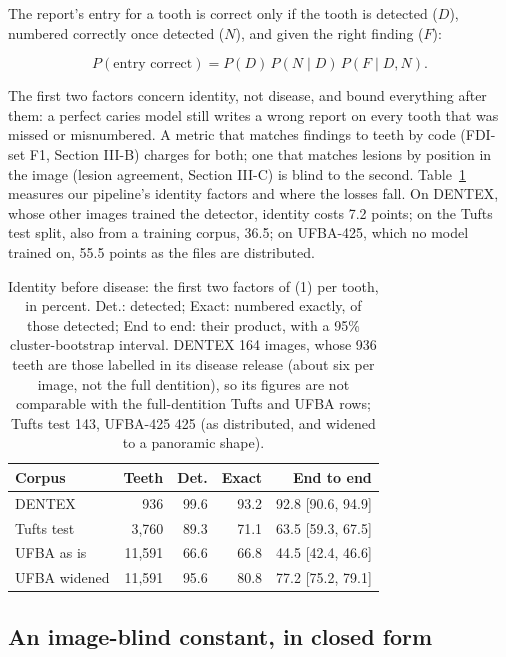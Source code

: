\documentclass[conference]{IEEEtran}
\begin{document}
The report's entry for a tooth is correct only if the tooth is detected ($D$), numbered correctly once detected ($N$), and given the right finding ($F$):

\begin{equation}
P(\text{entry correct}) = P(D)\, P(N \mid D)\, P(F \mid D, N).
\end{equation}

The first two factors concern identity, not disease, and bound everything after them: a perfect caries model still writes a wrong report on every tooth that was missed or misnumbered. A metric that matches findings to teeth by code (FDI-set F1, Section III-B) charges for both; one that matches lesions by position in the image (lesion agreement, Section III-C) is blind to the second. Table~\ref{tab:1} measures our pipeline's identity factors and where the losses fall. On DENTEX, whose other images trained the detector, identity costs 7.2 points; on the Tufts test split, also from a training corpus, 36.5; on UFBA-425, which no model trained on, 55.5 points as the files are distributed.

\begin{table}[t]
\centering
\caption{Identity before disease: the first two factors of (1) per tooth, in percent. Det.: detected; Exact: numbered exactly, of those detected; End to end: their product, with a 95\% cluster-bootstrap interval. DENTEX 164 images, whose 936 teeth are those labelled in its disease release (about six per image, not the full dentition), so its figures are not comparable with the full-dentition Tufts and UFBA rows; Tufts test 143, UFBA-425 425 (as distributed, and widened to a panoramic shape).}
\label{tab:1}
\footnotesize
\setlength{\tabcolsep}{3pt}
\begin{tabular}{>{\raggedright\arraybackslash}p{2.42cm}rrrr}
\toprule
Corpus & Teeth & Det. & Exact & End to end \\
\midrule
DENTEX & 936 & 99.6 & 93.2 & 92.8 [90.6, 94.9] \\
Tufts test & 3,760 & 89.3 & 71.1 & 63.5 [59.3, 67.5] \\
UFBA as is & 11,591 & 66.6 & 66.8 & 44.5 [42.4, 46.6] \\
UFBA widened & 11,591 & 95.6 & 80.8 & 77.2 [75.2, 79.1] \\
\bottomrule
\end{tabular}
\end{table}

\subsection{An image-blind constant, in closed form}
\end{document}
